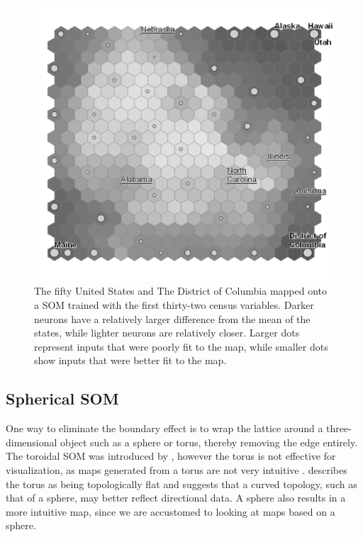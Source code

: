 \documentclass[10pt,titlepage]{article}
\begin{document}
\begin{figure}
\centering
\includegraphics[width=\linewidth]{gridedge_grey.pdf}
\caption{The fifty United States and The District of Columbia mapped onto a
SOM trained with the first thirty-two census variables.  Darker neurons have a
relatively larger difference from the mean of the states, while lighter
neurons are relatively closer.  Larger dots represent inputs that were poorly
fit to the map, while smaller dots show inputs that were better fit to the map.}
\label{figure1}
\end{figure}


\subsection{Spherical SOM}
One way to eliminate the boundary effect is to wrap the lattice around a
three-dimensional object such as a sphere or torus, thereby removing the edge
entirely. The toroidal SOM was introduced by \cite{li1993}, however the torus is
not effective for visualization, as maps generated from a torus are not
very intuitive \citep{ito2000,wu2006}.  \cite{ritter99} describes the torus as
being topologically flat and suggests that a curved topology, such as that of a
sphere, may better reflect directional data.  A sphere also results in a more
intuitive map, since we are accustomed to looking at maps based on a sphere.
\end{document}
